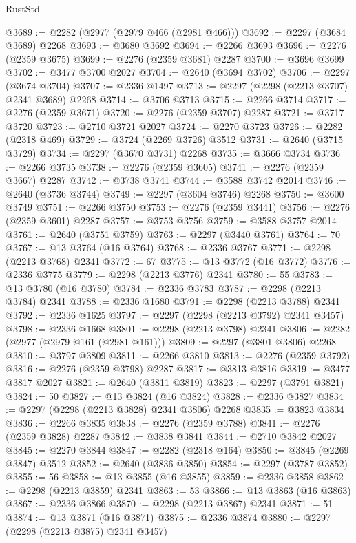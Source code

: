 \begin{lexlean}{RustStd}
\begin{coremodule}
{\begin{coremodule}
{{{{{{{{{{{{{{{{{{{{{{{{{{{{{{{{{{{{{{{{{{{{{{{{{{{{{{@3689 := @2282 (@2977 (@2979 @466 (@2981 @466)))
@3692 := @2297 (@3684 @3689) @2268
@3693 := @3680 @3692
@3694 := @2266 @3693
@3696 := @2276 (@2359 @3675)
@3699 := @2276 (@2359 @3681) @2287
@3700 := @3696 @3699
@3702 := @3477 @3700 @2027
@3704 := @2640 (@3694 @3702)
@3706 := @2297 (@3674 @3704)
@3707 := @2336 @1497
@3713 := @2297 (@2298 (@2213 @3707) @2341 @3689) @2268
@3714 := @3706 @3713
@3715 := @2266 @3714
@3717 := @2276 (@2359 @3671)
@3720 := @2276 (@2359 @3707) @2287
@3721 := @3717 @3720
@3723 := @2710 @3721 @2027
@3724 := @2270 @3723
@3726 := @2282 (@2318 @469)
@3729 := @3724 (@2269 @3726) @3512
@3731 := @2640 (@3715 @3729)
@3734 := @2297 (@3670 @3731) @2268
@3735 := @3666 @3734
@3736 := @2266 @3735
@3738 := @2276 (@2359 @3605)
@3741 := @2276 (@2359 @3667) @2287
@3742 := @3738 @3741
@3744 := @3588 @3742 @2014
@3746 := @2640 (@3736 @3744)
@3749 := @2297 (@3604 @3746) @2268
@3750 := @3600 @3749
@3751 := @2266 @3750
@3753 := @2276 (@2359 @3441)
@3756 := @2276 (@2359 @3601) @2287
@3757 := @3753 @3756
@3759 := @3588 @3757 @2014
@3761 := @2640 (@3751 @3759)
@3763 := @2297 (@3440 @3761)
@3764 := 70
@3767 := @13 @3764 (@16 @3764)
@3768 := @2336 @3767
@3771 := @2298 (@2213 @3768) @2341
@3772 := 67
@3775 := @13 @3772 (@16 @3772)
@3776 := @2336 @3775
@3779 := @2298 (@2213 @3776) @2341
@3780 := 55
@3783 := @13 @3780 (@16 @3780)
@3784 := @2336 @3783
@3787 := @2298 (@2213 @3784) @2341
@3788 := @2336 @1680
@3791 := @2298 (@2213 @3788) @2341
@3792 := @2336 @1625
@3797 := @2297 (@2298 (@2213 @3792) @2341 @3457)
@3798 := @2336 @1668
@3801 := @2298 (@2213 @3798) @2341
@3806 := @2282 (@2977 (@2979 @161 (@2981 @161)))
@3809 := @2297 (@3801 @3806) @2268
@3810 := @3797 @3809
@3811 := @2266 @3810
@3813 := @2276 (@2359 @3792)
@3816 := @2276 (@2359 @3798) @2287
@3817 := @3813 @3816
@3819 := @3477 @3817 @2027
@3821 := @2640 (@3811 @3819)
@3823 := @2297 (@3791 @3821)
@3824 := 50
@3827 := @13 @3824 (@16 @3824)
@3828 := @2336 @3827
@3834 := @2297 (@2298 (@2213 @3828) @2341 @3806) @2268
@3835 := @3823 @3834
@3836 := @2266 @3835
@3838 := @2276 (@2359 @3788)
@3841 := @2276 (@2359 @3828) @2287
@3842 := @3838 @3841
@3844 := @2710 @3842 @2027
@3845 := @2270 @3844
@3847 := @2282 (@2318 @164)
@3850 := @3845 (@2269 @3847) @3512
@3852 := @2640 (@3836 @3850)
@3854 := @2297 (@3787 @3852)
@3855 := 56
@3858 := @13 @3855 (@16 @3855)
@3859 := @2336 @3858
@3862 := @2298 (@2213 @3859) @2341
@3863 := 53
@3866 := @13 @3863 (@16 @3863)
@3867 := @2336 @3866
@3870 := @2298 (@2213 @3867) @2341
@3871 := 51
@3874 := @13 @3871 (@16 @3871)
@3875 := @2336 @3874
@3880 := @2297 (@2298 (@2213 @3875) @2341 @3457)
}}}}}}}}}}}}}}}}}}}}}}}}}}}}}}}}}}}}}}}}}}}}}}}}}}}}}}
\end{coremodule}}
\end{coremodule}
\end{lexlean}
